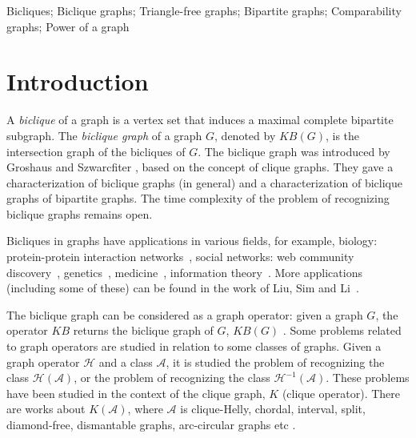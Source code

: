 \documentclass{article}
\newcommand{\define}[1]{\emph{#1}}
\newcommand{\mA}{\ensuremath{\mathcal{A}}}
\newcommand{\mH}{\ensuremath{\mathcal{H}}}
\begin{document}
\normalsize
\vspace*{1cm}
 Bicliques; Biclique graphs; Triangle-free graphs;
Bipartite graphs; Comparability graphs; Power of a graph
\newpage


 

\section{Introduction}

A \define{biclique}  of a graph is  a vertex set that  induces a maximal
complete  bipartite subgraph.   The \define{biclique  graph} of  a graph
$G$, denoted by  $KB(G)$, is the intersection graph of  the bicliques of
$G$.
%
The  biclique   graph  was   introduced  by  Groshaus   and  Szwarcfiter
\cite{Groshaus2010}, based on the concept of clique graphs.  They gave a
characterization of biclique graphs  (in general) and a characterization
of biclique graphs of bipartite graphs.
The  time  complexity of  the  problem  of recognizing  biclique  graphs
remains open.

Bicliques in  graphs have applications  in various fields,  for example,
bio\-lo\-gy: protein-protein  interaction networks~\cite{Bu2003}, social
networks:        web        community        discovery~\cite{Kumar1999},
genetics~\cite{Atluri2010},  medicine~\cite{Nagarajan2008},  information
theory~\cite{Haemers2001}.  More applications  (including some of these)
can be found in the work of Liu, Sim and Li~\cite{Liu2006}.

The biclique graph can be considered  as a graph operator: given a graph
$G$,  the operator  $KB$  returns  the biclique  graph  of $G$,  $KB(G)$
\cite{GroshausGuedesMontero2016,Groshaus2013,Groshaus2009}.
%
Some problems related to graph operators are studied in relation to some
classes of graphs.   Given a graph operator $\mH$ and  a class $\mA$, it
is  studied the  problem of  recognizing  the class  $\mH(\mA)$, or  the
problem of recognizing the class $\mH^{-1}(\mA)$.
%
These problems have been studied in the context of the clique graph, $K$
(clique  operator).  There  are works  about $K(\mA)$,  where $\mA$  is
clique-Helly,  chordal,  interval,   split,  diamond-free,  dismantable
graphs,               arc-circular              graphs               etc
\cite{Bondy2003,Duran2001,Larrion2002,Lin2010,Prisner1999}.
\end{document}
